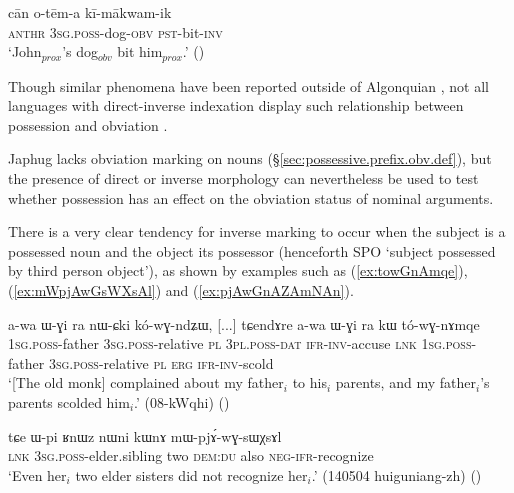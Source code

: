 \begin{exe}
\ex \label{ex:cree.kiimaakwamik}
 \gll cān o-tēm-a kī-mākwam-ik  \\
  \textsc{anthr} \textsc{3sg}.\textsc{poss}-dog-\textsc{obv} \textsc{pst}-bit-\textsc{inv} \\
 \glt `John$_{prox}$'s dog$_{obv}$ bit him$_{prox}$.' (\citealt[25]{wolfart73})
\end{exe}

Though similar phenomena have been reported outside of Algonquian \citep{aissen97obviation}, not all languages with direct-inverse indexation display such relationship between possession and obviation \citep{haude16symmetrical}.
 
Japhug lacks obviation marking on nouns (§\ref{sec:possessive.prefix.obv.def}), but the presence of direct or inverse morphology can nevertheless be used to test whether possession has an effect on the obviation status of nominal arguments.

There is a very clear tendency for inverse marking to occur when the subject is a possessed noun and the object its possessor (henceforth  SPO `subject possessed by third person object'), as shown by examples such as (\ref{ex:towGnAmqe}), (\ref{ex:mWpjAwGsWXsAl}) and (\ref{ex:pjAwGnAZAmNAn}).

\begin{exe}
\ex \label{ex:towGnAmqe}
 \gll   a-wa ɯ-ɣi ra nɯ-ɕki kó-wɣ-ndʑɯ, [...] tɕendɤre  a-wa ɯ-ɣi ra kɯ tó-wɣ-nɤmqe \\
  \textsc{1sg}.\textsc{poss}-father \textsc{3sg}.\textsc{poss}-relative  \textsc{pl} \textsc{3pl}.\textsc{poss}-\textsc{dat} \textsc{ifr}-\textsc{inv}-accuse  {  } \textsc{lnk}  \textsc{1sg}.\textsc{poss}-father \textsc{3sg}.\textsc{poss}-relative \textsc{pl} \textsc{erg} \textsc{ifr}-\textsc{inv}-scold \\
 \glt `[The old monk] complained about my father$_i$ to his$_i$ parents, and my father$_i$'s parents scolded him$_i$.' (08-kWqhi)
()
\end{exe}  
  
\begin{exe}
\ex \label{ex:mWpjAwGsWXsAl}
 \gll  tɕe ɯ-pi ʁnɯz nɯni kɯnɤ mɯ-pjɤ́-wɣ-sɯχsɤl \\
 \textsc{lnk} \textsc{3sg}.\textsc{poss}-elder.sibling two \textsc{dem}:\textsc{du} also \textsc{neg}-\textsc{ifr}-recognize \\
 \glt `Even her$_i$ two elder sisters did not recognize her$_i$.' (140504 huiguniang-zh)
()
\end{exe}
 
